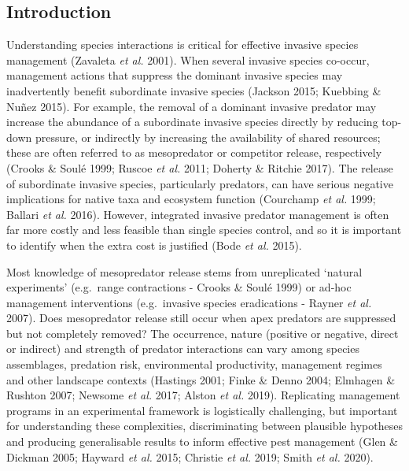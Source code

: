 \documentclass[11pt,a4paper,titlepage,twoside,openright]{style/unimelbthesis}
\begin{document}
\begin{mainmatter}
\hypertarget{introduction-4}{%
\section{Introduction}\label{introduction-4}}

Understanding species interactions is critical for effective invasive species management (Zavaleta \emph{et al.} 2001). When several invasive species co-occur, management actions that suppress the dominant invasive species may inadvertently benefit subordinate invasive species (Jackson 2015; Kuebbing \& Nuñez 2015). For example, the removal of a dominant invasive predator may increase the abundance of a subordinate invasive species directly by reducing top-down pressure, or indirectly by increasing the availability of shared resources; these are often referred to as mesopredator or competitor release, respectively (Crooks \& Soulé 1999; Ruscoe \emph{et al.} 2011; Doherty \& Ritchie 2017). The release of subordinate invasive species, particularly predators, can have serious negative implications for native taxa and ecosystem function (Courchamp \emph{et al.} 1999; Ballari \emph{et al.} 2016). However, integrated invasive predator management is often far more costly and less feasible than single species control, and so it is important to identify when the extra cost is justified (Bode \emph{et al.} 2015).

Most knowledge of mesopredator release stems from unreplicated `natural experiments' (e.g.~range contractions - Crooks \& Soulé 1999) or ad-hoc management interventions (e.g.~invasive species eradications - Rayner \emph{et al.} 2007). Does mesopredator release still occur when apex predators are suppressed but not completely removed? The occurrence, nature (positive or negative, direct or indirect) and strength of predator interactions can vary among species assemblages, predation risk, environmental productivity, management regimes and other landscape contexts (Hastings 2001; Finke \& Denno 2004; Elmhagen \& Rushton 2007; Newsome \emph{et al.} 2017; Alston \emph{et al.} 2019). Replicating management programs in an experimental framework is logistically challenging, but important for understanding these complexities, discriminating between plausible hypotheses and producing generalisable results to inform effective pest management (Glen \& Dickman 2005; Hayward \emph{et al.} 2015; Christie \emph{et al.} 2019; Smith \emph{et al.} 2020).


\end{mainmatter}
\end{document}
